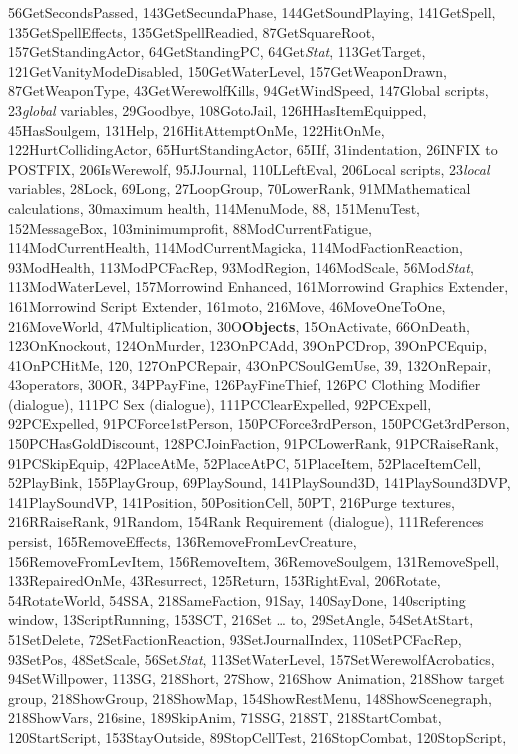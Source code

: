 \documentclass[
]{article}
\begin{document}
56GetSecondsPassed, 143GetSecundaPhase, 144GetSoundPlaying, 141GetSpell,
135GetSpellEffects, 135GetSpellReadied, 87GetSquareRoot,
157GetStandingActor, 64GetStandingPC, 64Get\emph{Stat}, 113GetTarget,
121GetVanityModeDisabled, 150GetWaterLevel, 157GetWeaponDrawn,
87GetWeaponType, 43GetWerewolfKills, 94GetWindSpeed, 147Global scripts,
23\emph{global} variables, 29Goodbye, 108GotoJail, 126HHasItemEquipped,
45HasSoulgem, 131Help, 216HitAttemptOnMe, 122HitOnMe,
122HurtCollidingActor, 65HurtStandingActor, 65IIf, 31indentation,
26INFIX to POSTFIX, 206IsWerewolf, 95JJournal, 110LLeftEval, 206Local
scripts, 23\emph{local} variables, 28Lock, 69Long, 27LoopGroup,
70LowerRank, 91MMathematical calculations, 30maximum health,
114MenuMode, 88, 151MenuTest, 152MessageBox, 103minimumprofit,
88ModCurrentFatigue, 114ModCurrentHealth, 114ModCurrentMagicka,
114ModFactionReaction, 93ModHealth, 113ModPCFacRep, 93ModRegion,
146ModScale, 56Mod\emph{Stat}, 113ModWaterLevel, 157Morrowind Enhanced,
161Morrowind Graphics Extender, 161Morrowind Script Extender, 161moto,
216Move, 46MoveOneToOne, 216MoveWorld, 47Multiplication,
30O\textbf{Objects}, 15OnActivate, 66OnDeath, 123OnKnockout,
124OnMurder, 123OnPCAdd, 39OnPCDrop, 39OnPCEquip, 41OnPCHitMe, 120,
127OnPCRepair, 43OnPCSoulGemUse, 39, 132OnRepair, 43operators, 30OR,
34PPayFine, 126PayFineThief, 126PC Clothing Modifier (dialogue), 111PC
Sex (dialogue), 111PCClearExpelled, 92PCExpell, 92PCExpelled,
91PCForce1stPerson, 150PCForce3rdPerson, 150PCGet3rdPerson,
150PCHasGoldDiscount, 128PCJoinFaction, 91PCLowerRank, 91PCRaiseRank,
91PCSkipEquip, 42PlaceAtMe, 52PlaceAtPC, 51PlaceItem, 52PlaceItemCell,
52PlayBink, 155PlayGroup, 69PlaySound, 141PlaySound3D, 141PlaySound3DVP,
141PlaySoundVP, 141Position, 50PositionCell, 50PT, 216Purge textures,
216RRaiseRank, 91Random, 154Rank Requirement (dialogue), 111References
persist, 165RemoveEffects, 136RemoveFromLevCreature,
156RemoveFromLevItem, 156RemoveItem, 36RemoveSoulgem, 131RemoveSpell,
133RepairedOnMe, 43Resurrect, 125Return, 153RightEval, 206Rotate,
54RotateWorld, 54SSA, 218SameFaction, 91Say, 140SayDone, 140scripting
window, 13ScriptRunning, 153SCT, 216Set \ldots{} to, 29SetAngle,
54SetAtStart, 51SetDelete, 72SetFactionReaction, 93SetJournalIndex,
110SetPCFacRep, 93SetPos, 48SetScale, 56Set\emph{Stat},
113SetWaterLevel, 157SetWerewolfAcrobatics, 94SetWillpower, 113SG,
218Short, 27Show, 216Show Animation, 218Show target group, 218ShowGroup,
218ShowMap, 154ShowRestMenu, 148ShowScenegraph, 218ShowVars, 216sine,
189SkipAnim, 71SSG, 218ST, 218StartCombat, 120StartScript,
153StayOutside, 89StopCellTest, 216StopCombat, 120StopScript,
\end{document}
